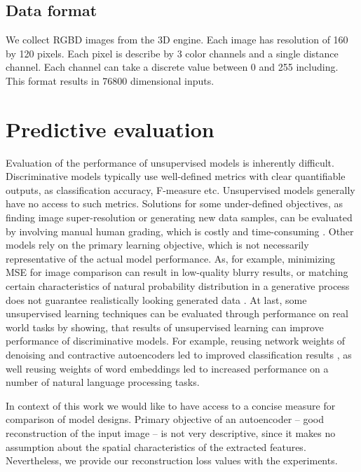 \subsection{Data format}

We collect RGBD images from the 3D engine. Each image has resolution of 160 by 120 pixels. Each pixel is describe by 3 color channels and a single distance channel. Each channel can take a discrete value between 0 and 255 including. This format results in 76800 dimensional inputs.


\section{Predictive evaluation} \label{ss:score}

Evaluation of the performance of unsupervised models is inherently difficult.
Discriminative models typically use well-defined metrics with clear quantifiable outputs, as classification accuracy, F-measure etc. Unsupervised models generally have no access to such metrics.
Solutions for some under-defined objectives, as finding image super-resolution or generating new data samples, can be evaluated by involving manual human grading, which is costly and time-consuming \cite{Dahl2017, Goodfellow2014}.
Other models rely on the primary learning objective, which is not necessarily representative of the actual model performance. As, for example, minimizing MSE for image comparison can result in low-quality blurry results, or matching certain characteristics of natural probability distribution in a generative process does not guarantee realistically looking generated data \cite{Li2015, Mathieu2015}. At last, some unsupervised learning techniques can be evaluated through performance on real world tasks by showing, that results of unsupervised learning can improve performance of discriminative models. For example, reusing network weights of denoising and contractive autoencoders led to improved classification results \cite{Rifai2011, Vincent2010}, as well reusing weights of word embeddings \cite{NIPS2013_5021} led to increased performance on a number of natural language processing tasks.

In context of this work we would like to have access to a concise measure for comparison of model designs.
Primary objective of an autoencoder -- good reconstruction of the input image -- is not very descriptive, since it makes no assumption about the spatial characteristics of the extracted features. Nevertheless, we provide our reconstruction loss values with the experiments.

